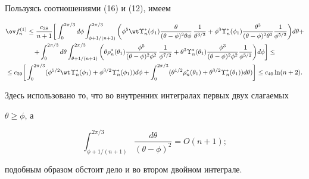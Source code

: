 Пользуясь соотношениями (16) и (12), имеем


\begin{multline}


\ov f_n^{(1)}\le \frac {c_{38}}{n+1}


\bigg[\int_0^{{2\pi}/{3}} d\phi \int_{\phi+1/(n+1)}^{{2\pi}/{3}}


\bigg(\phi^5\wt \Upsilon_n^* (\phi_1) \frac{\theta}


{(\theta-\phi)^2 \theta \phi }\,\frac{1}{\theta^{3/2}} +


\phi^3 \Upsilon_n^* (\phi_1)\frac{\theta^3}


{(\theta-\phi)^2 \theta^2}


\frac{1}{\phi^{5/2} }\bigg )d\theta + \\


%


+\int_0^{{2\pi}/{3}}d\theta


\int_{\theta +1/(n+1)}^{{2\pi}/{3}}


\bigg(\theta \rho_n^* (\theta_1)


\frac{\phi^5}{(\theta-\phi)^2 \phi^2}\,\frac{1}{ \phi^{7/2}}+


\theta^3 \Upsilon_n^* (\theta_1)


\frac {\phi^3}{(\theta-\phi)^2\phi^2}\frac{1}{ \phi^{5/2}}


\bigg)d\phi\bigg ] \le \\


%


\le c_{39}


\bigg[\int_0^{{2\pi}/{3}}(\phi^{5/2}


\wt \Upsilon_n^* (\phi_1)+\phi^{{3}/{2}}\Upsilon_n^* (\phi_1))d\phi+


\int_0^{{2\pi}/{3}}(\theta^{{1}/{2}}


\rho_n^* (\theta_1)+\theta^{{3}/{2}}\Upsilon_n^*(\theta_1))


d\theta )\bigg]\le c_{40}\ln (n+2).


\end{multline}


Здесь использовано то, что во внутренних интегралах первых двух слагаемых


$\theta \ge \phi $, а


$$


\int_{\phi+{1}/(n+1)}^{{2\pi}/{3}}


\frac{d\theta}{(\theta-\phi)^2 }=O(n+1) ;


$$


подобным образом обстоит дело и во втором двойном интеграле.


